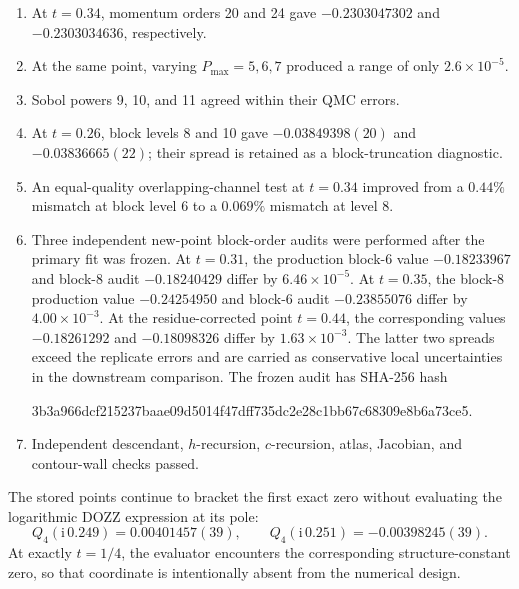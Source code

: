 \documentclass[11pt]{article}
\newcommand{\ii}{\mathrm{i}}
\begin{document}
\begin{enumerate}
  \item At $t=0.34$, momentum orders 20 and 24 gave $-0.2303047302$ and
  $-0.2303034636$, respectively.

  \item At the same point, varying $P_{\max}=5,6,7$ produced a range of only
  $2.6\times10^{-5}$.

  \item Sobol powers 9, 10, and 11 agreed within their QMC errors.

  \item At $t=0.26$, block levels 8 and 10 gave $-0.03849398(20)$ and
  $-0.03836665(22)$; their spread is retained as a block-truncation
  diagnostic.

  \item An equal-quality overlapping-channel test at $t=0.34$ improved from
  a $0.44\%$ mismatch at block level 6 to a $0.069\%$ mismatch at level 8.

  \newpage
  \item Three independent new-point block-order audits were performed after
  the primary fit was frozen.  At $t=0.31$, the production block-6 value
  $-0.18233967$ and block-8 audit $-0.18240429$ differ by
  $6.46\times10^{-5}$.  At $t=0.35$, the block-8 production value
  $-0.24254950$ and block-6 audit $-0.23855076$ differ by
  $4.00\times10^{-3}$.  At the residue-corrected point $t=0.44$, the
  corresponding values $-0.18261292$ and $-0.18098326$ differ by
  $1.63\times10^{-3}$.  The latter two spreads exceed the replicate errors
  and are carried as conservative local uncertainties in the downstream
  comparison.  The frozen audit has SHA-256 hash
  \begin{center}
  \small\ttfamily
  3b3a966dcf215237baae09d5014f47dff735dc2e28c1bb67c68309e8b6a73ce5.
  \end{center}

  \item Independent descendant, $h$-recursion, $c$-recursion, atlas,
  Jacobian, and contour-wall checks passed.
\end{enumerate}

The stored points continue to bracket the first exact zero without evaluating
the logarithmic DOZZ expression at its pole:
\begin{equation}
  Q_4(\ii\,0.249)=0.00401457(39),
  \qquad
  Q_4(\ii\,0.251)=-0.00398245(39).
\end{equation}
At exactly $t=1/4$, the evaluator encounters the corresponding
structure-constant zero, so that coordinate is intentionally absent from the
numerical design.
\end{document}
